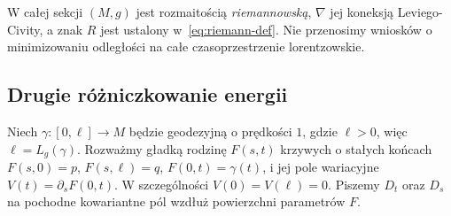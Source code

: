 W całej sekcji $(M,g)$ jest rozmaitością
\emph{riemannowską}, $\nabla$ jej koneksją
Leviego-Civity, a znak $R$ jest ustalony
w~\eqref{eq:riemann-def}. Nie przenosimy
wniosków o minimizowaniu odległości na całe
czasoprzestrzenie lorentzowskie.

\subsection*{Drugie różniczkowanie energii}

Niech $\gamma:[0,\ell]\to M$ będzie geodezyjną
o prędkości $1$, gdzie $\ell>0$, więc $\ell=L_g(\gamma)$.
Rozważmy gładką rodzinę $F(s,t)$ krzywych
o stałych końcach
$F(s,0)=p$, $F(s,\ell)=q$,
$F(0,t)=\gamma(t)$, i jej pole wariacyjne
$V(t)=\partial_sF(0,t)$. W szczególności
$V(0)=V(\ell)=0$. Piszemy $D_t$ oraz $D_s$
na pochodne kowariantne pól wzdłuż powierzchni
parametrów $F$.

